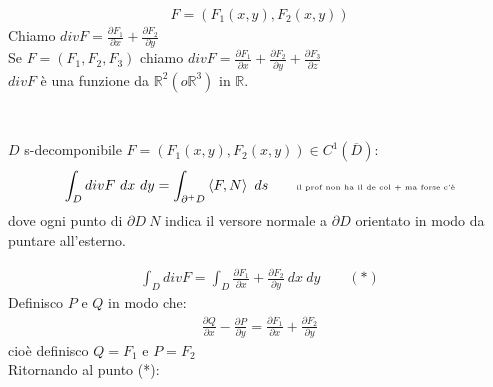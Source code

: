 \documentclass[a4paper, oneside]{article}
\begin{document}
\begin{center}
\end{center}
\begin{definition}[Divergenza]
  \begin{gather*}
    F = \left( F_1(x,y), F_2(x,y) \right) 
  \end{gather*}
  Chiamo $div F = \frac{\partial F_1}{\partial x} + \frac{\partial F_2}{\partial y}$\\
  Se $F= (F_1, F_2, F_3)$ chiamo $div F = \frac{\partial F_1}{\partial x} + \frac{\partial F_2}{\partial y} + \frac{\partial F_3}{\partial z}$\\
  $div F$ è una funzione da $\mathbb{R}^2(o \mathbb{R}^3)$ in $\mathbb{R}$.
\end{definition}
\hfill\\
\begin{theorem}
   $D$ s-decomponibile  $F = \left(F_1(x,y) , F_2(x,y)\right) \in C^1(\overline{D})$:\\
  \begin{gather*}
    \int_D div F \ dx \ dy = \int_{\partial^+ D} \left\langle F, N \right\rangle \ ds \qquad \tiny{\text{il prof non ha il de col + ma forse c'è}}
  \end{gather*}
  dove ogni punto di $\partial D \ N$ indica il versore normale a $\partial D$ orientato in modo da puntare all'esterno.
\end{theorem}
\begin{gather*}
    \int_D div F = \int_D \frac{\partial F_1}{\partial x} + \frac{\partial F_2}{\partial y} \ dx \ dy \qquad (*)
  \end{gather*}
  Definisco $P$ e $Q$ in modo che:
  \begin{gather*}
    \frac{\partial Q}{\partial x} - \frac{\partial P}{\partial y} = \frac{\partial F_1}{\partial x} + \frac{\partial F_2}{\partial y}
  \end{gather*}
  cioè definisco $Q = F_1$ e $P = F_2$\\
  Ritornando al punto (*):
\end{document}

